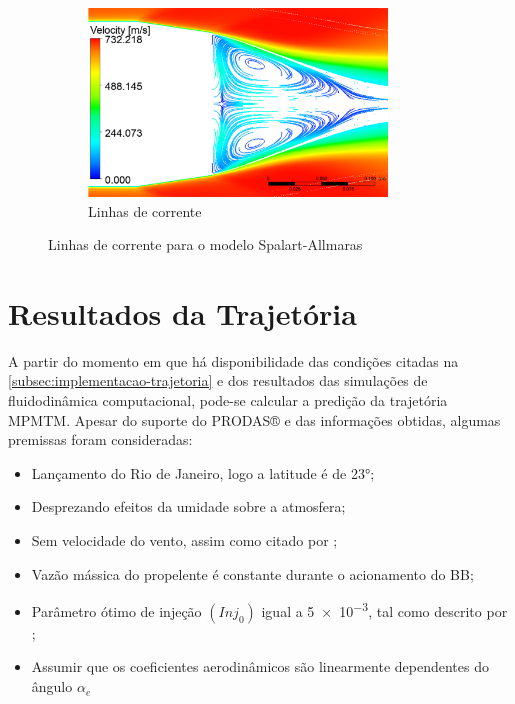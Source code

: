 \begin{figure}[!ht]
    \hfill
    \begin{subfigure}[b]{0.47\textwidth}
        \centering
        \includegraphics[height=5cm,width=\textwidth]{corrente-velocidade-SPALART-2pol.png}
        \caption{Linhas de corrente}
        \label{fig:corrente-velocidade-bb-2pol-RANS}
    \end{subfigure} 	
 	\caption{Linhas de corrente para o modelo Spalart-Allmaras}
    \label{fig:influencia-RANS-bb}
\end{figure}

\section{Resultados da Trajetória}\label{sec:resultados-trajetoria}

A partir do momento em que há disponibilidade das condições citadas na \autoref{subsec:implementacao-trajetoria} e dos resultados das simulações de fluidodinâmica computacional, pode-se calcular a predição da trajetória MPMTM. Apesar do suporte do PRODAS® e das informações obtidas, algumas premissas foram consideradas:

\begin{itemize}
    \item Lançamento do Rio de Janeiro, logo a latitude é de \ang{23};
    \item Desprezando efeitos da umidade sobre a atmosfera;
    \item Sem velocidade do vento, assim como citado por \citeauthor{Rosendo2020};
    \item Vazão mássica do propelente é constante durante o acionamento do BB;
    \item Parâmetro ótimo de injeção \(\left(Inj_{0}\right)\) igual a \num{5e-3}, tal como descrito por \citeauthor{DAVENAS1993329};
    \item Assumir que os coeficientes aerodinâmicos são linearmente dependentes do ângulo \(\alpha_{e}\)
\end{itemize}

